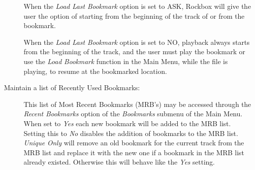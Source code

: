 \begin{description}
  When the \emph{Load Last Bookmark} option is set to ASK, Rockbox will
  give the user the option of starting from the beginning of the track
  of or from the bookmark. 

  When the \emph{Load Last Bookmark} option is set to NO, playback always
  starts from the beginning of the track, and the user must play the bookmark
  or use the \emph{Load Bookmark} function in the Main Menu, while the file
  is playing, to resume at the bookmarked location.
    
  \item [Maintain a list of Recently Used Bookmarks: ]

  This list of Most Recent Bookmarks (MRB's) may be accessed through the
  \emph{Recent Bookmarks} option of the \emph{Bookmarks} submenu of the 
  Main Menu. When set to \emph{Yes} each new bookmark will be added to the
  MRB list. Setting this to \emph{No} disables the addition of bookmarks to
  the MRB list. \emph{Unique Only} will remove an old bookmark for the current
  track from the MRB list and replace it with the new one if a bookmark in the
  MRB list already existed. Otherwise this will behave like the 
  \emph{Yes} setting.
  \end{description}
